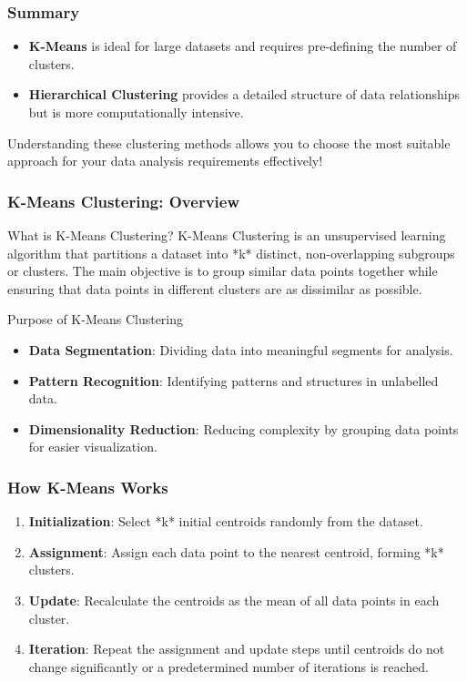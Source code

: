 \documentclass[aspectratio=169]{beamer}
\begin{document}
\begin{frame}[fragile]
    \frametitle{Summary}
    \begin{itemize}
        \item \textbf{K-Means} is ideal for large datasets and requires pre-defining the number of clusters.
        \item \textbf{Hierarchical Clustering} provides a detailed structure of data relationships but is more computationally intensive.
    \end{itemize}
    
    Understanding these clustering methods allows you to choose the most suitable approach for your data analysis requirements effectively!
\end{frame}

\begin{frame}[fragile]
    \frametitle{K-Means Clustering: Overview}
    \begin{block}{What is K-Means Clustering?}
        K-Means Clustering is an unsupervised learning algorithm that partitions a dataset into *k* distinct, non-overlapping subgroups or clusters. The main objective is to group similar data points together while ensuring that data points in different clusters are as dissimilar as possible.
    \end{block}
    
    \begin{block}{Purpose of K-Means Clustering}
        \begin{itemize}
            \item \textbf{Data Segmentation}: Dividing data into meaningful segments for analysis.
            \item \textbf{Pattern Recognition}: Identifying patterns and structures in unlabelled data.
            \item \textbf{Dimensionality Reduction}: Reducing complexity by grouping data points for easier visualization.
        \end{itemize}
    \end{block}
\end{frame}

\begin{frame}[fragile]
    \frametitle{How K-Means Works}
    \begin{enumerate}
        \item \textbf{Initialization}: Select *k* initial centroids randomly from the dataset.
        \item \textbf{Assignment}: Assign each data point to the nearest centroid, forming *k* clusters.
        \item \textbf{Update}: Recalculate the centroids as the mean of all data points in each cluster.
        \item \textbf{Iteration}: Repeat the assignment and update steps until centroids do not change significantly or a predetermined number of iterations is reached.
    \end{enumerate}
\end{frame}
\end{document}
